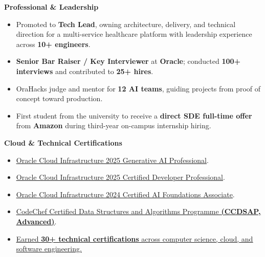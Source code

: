 \documentclass[10pt,a4paper]{article}
\newcommand{\achievementCategory}[1]{\par\vspace{4pt}\noindent\textbf{#1}\par\vspace{1.5pt}}
\newcommand{\resumeHref}[2]{\href{#1}{\uline{#2}}}
\begin{document}
\achievementCategory{Professional \& Leadership}
{\small
\begin{itemize}[leftmargin=0.30in,itemsep=1.5pt,topsep=2pt]
  \item Promoted to \textbf{Tech Lead}, owning architecture, delivery, and technical direction for a multi-service healthcare platform with leadership experience across \textbf{10+ engineers}.
  \item \textbf{Senior Bar Raiser / Key Interviewer} at \textbf{Oracle}; conducted \textbf{100+ interviews} and contributed to \textbf{25+ hires}.
  \item OraHacks judge and mentor for \textbf{12 AI teams}, guiding projects from proof of concept toward production.
  \item First student from the university to receive a \textbf{direct SDE full-time offer} from \textbf{Amazon} during third-year on-campus internship hiring.
\end{itemize}
}

\achievementCategory{Cloud \& Technical Certifications}
{\small
\begin{itemize}[leftmargin=0.30in,itemsep=1.5pt,topsep=2pt]
  \item \resumeHref{https://catalog-education.oracle.com/pls/certview/sharebadge?id=C72EFA41F0C8B51EEDCF7E759B92FCA34E59F058D11AFD39D71DB564ABB8DDFE}{Oracle Cloud Infrastructure 2025 Generative AI Professional}.
  \item \resumeHref{https://catalog-education.oracle.com/ords/certview/sharebadge?id=E6EA0D02CCCB8650680C392264F1F29B72C5B8895C915ED25C8F1C63C6D850EE}{Oracle Cloud Infrastructure 2025 Certified Developer Professional}.
  \item \resumeHref{https://catalog-education.oracle.com/ords/certview/sharebadge?id=0A80139CE66ACD03D6226677B4ED648AE55C308A559F9D9E222F1906F6DF6904}{Oracle Cloud Infrastructure 2024 Certified AI Foundations Associate}.
  \item \resumeHref{https://www.codechef.com/certificates/public/1765982}{CodeChef Certified Data Structures and Algorithms Programme \textbf{(CCDSAP, Advanced)}}.
  \item \resumeHref{https://www.linkedin.com/in/snjumaheshwari/details/certifications/}{Earned \textbf{30+ technical certifications} across computer science, cloud, and software engineering.}
\end{itemize}
}
\end{document}
